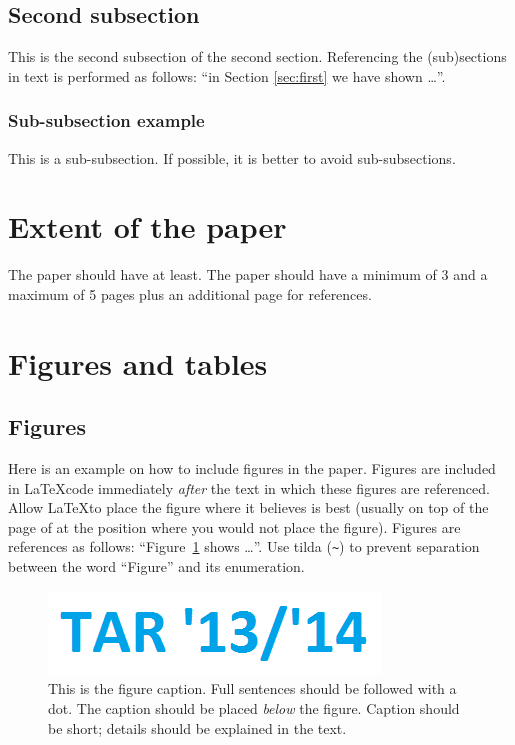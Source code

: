 \documentclass[10pt, a4paper]{article}
\begin{document}
\subsection{Second subsection}

This is the second subsection of the second section. Referencing the (sub)sections in text is performed as follows: ``in Section \ref{sec:first} we have shown \dots''.

\subsubsection{Sub-subsection example} 

This is a sub-subsection. If possible, it is better to avoid sub-subsections. 

\section{Extent of the paper}

The paper should have at least. The paper should have a minimum of 3 and a maximum of 5 pages plus an additional page for references.

\section{Figures and tables}

\subsection{Figures}

Here is an example on how to include figures in the paper. Figures are included in \LaTeX code immediately \textit{after} the text in which these figures are referenced. Allow \LaTeX to place the figure where it believes is best (usually on top of the page of at the position where you would not place the figure). Figures are references as follows: ``Figure~\ref{fig:figure1} shows \dots''. Use tilda (\verb.~.) to prevent separation between the word ``Figure'' and its enumeration. 

\begin{figure}
\begin{center}
\includegraphics[width=\columnwidth]{tar1314}
\caption{This is the figure caption. Full sentences should be followed with a dot. The caption should be placed \textit{below} the figure. Caption should be short; details should be explained in the text.}
\label{fig:figure1}
\end{center}
\end{figure}
\end{document}
